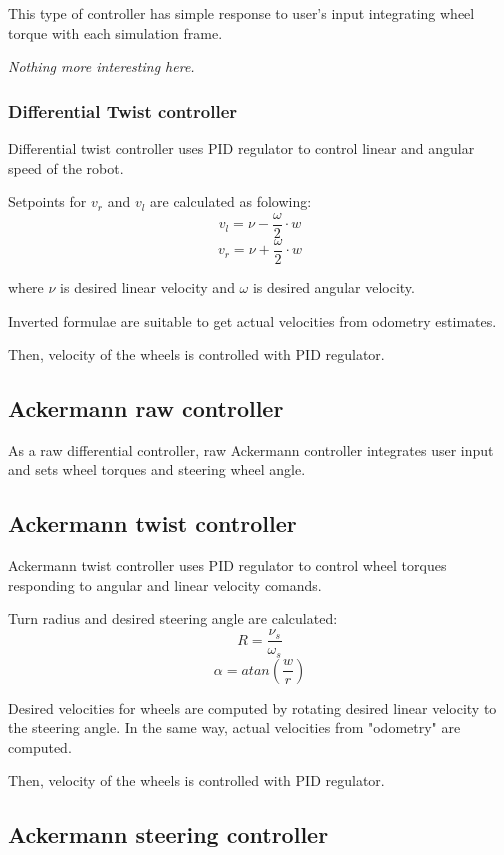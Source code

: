 \documentclass[a4paper,11pt]{article}
\begin{document}
This type of controller has simple response to user's input integrating wheel torque with each simulation frame.

\textit{Nothing more interesting here.}

\subsubsection{Differential Twist controller}

Differential twist controller uses PID regulator to control linear and angular speed of the robot. 

Setpoints for $v_r$ and $v_l$ are calculated as folowing:
\[
v_l = \nu - \frac{\omega}{2} \cdot w
\]
\[
v_r = \nu + \frac{\omega}{2} \cdot w
\]

where $\nu$ is desired linear velocity and $\omega$ is desired angular velocity.


Inverted formulae are suitable to get actual velocities from odometry estimates.


Then, velocity of the wheels is controlled with PID regulator.

\subsection{Ackermann raw controller}

As a raw differential controller, raw Ackermann controller integrates user input and sets wheel torques and steering wheel angle.

\subsection{Ackermann twist controller}

Ackermann twist controller uses PID regulator to control wheel torques responding to angular and linear velocity comands. 

Turn radius and desired steering angle are calculated: 
\[
R = \frac{\nu_s}{\omega_s}
\]
\[
\alpha = atan(\frac{w}{r})
\]

Desired velocities for wheels are computed by rotating desired linear velocity to the steering angle. 
In the same way, actual velocities from "odometry" are computed.

Then, velocity of the wheels is controlled with PID regulator.

\subsection{Ackermann steering controller}
\end{document}
